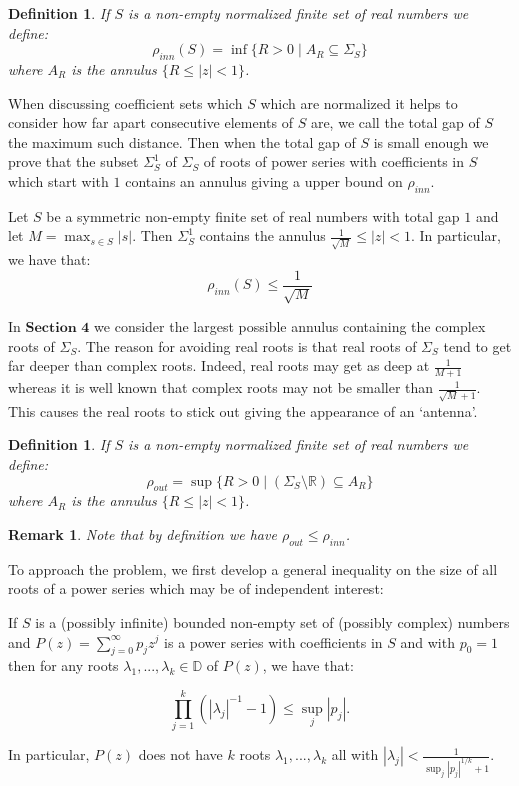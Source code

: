 \documentclass[11pt]{amsart}
\newtheorem{definition}[theorem]{Definition}
\newtheorem*{remark}{Remark}
\numberwithin{theorem}{section} %
\numberwithin{corollary}{section}
\numberwithin{lemma}{section}
\numberwithin{proposition}{section}
\numberwithin{definition}{section}
\newenvironment{customthm}[1]
	{\renewcommand\theinnercustomthm{#1}\innercustomthm}
	{\endinnercustomthm}
\begin{document}
\begin{definition}
If $S$ is a non-empty normalized finite set of real numbers we define:
$$\rho_{inn}(S) = \inf \{R > 0 \mid A_R \subseteq \Sigma_S \} $$
where $A_R$ is the annulus $\{ R \leqslant |z| < 1\}$.
\end{definition}

When discussing coefficient sets which $S$ which are normalized it helps to consider how far apart consecutive elements of $S$ are, we call the total gap of $S$ the maximum such distance. Then when the total gap of $S$ is small enough we prove that the subset $\Sigma_S^1$ of $\Sigma_S$ of roots of power series with coefficients in $S$ which start with $1$ contains an annulus giving a upper bound on $\rho_{inn}$.

\begin{customthm}{\ref{annulus}}
Let $S$ be a symmetric non-empty finite set of real numbers with total gap $1$ and let $M = \max_{s \in S} |s|$. Then $\Sigma^1_S$ contains the annulus $\frac{1}{\sqrt{M}} \leqslant |z| < 1$. In particular, we have that:
$$\rho_{inn}(S) \leqslant \frac{1}{\sqrt{M}} $$
\end{customthm}

In $\textbf{Section 4}$ we consider the largest possible annulus containing the complex roots of $\Sigma_S$. The reason for avoiding real roots is that real roots of $\Sigma_S$ tend to get far deeper than complex roots. Indeed, real roots may get as deep at $\frac{1}{M+1}$ whereas it is well known that complex roots may not be smaller than $\frac{1}{\sqrt{M}+1}$. This causes the real roots to stick out giving the appearance of an `antenna'.

\begin{definition}
If $S$ is a non-empty normalized finite set of real numbers we define:
$$ \rho_{out} = \sup \{ R > 0 \mid (\Sigma_S \setminus \mathbb{R}) \subseteq A_R \} $$
where $A_R$ is the annulus $\{ R \leqslant |z| < 1\}$.
\end{definition}

\begin{remark}
Note that by definition we have $\rho_{out} \leqslant \rho_{inn}$.
\end{remark}

To approach the problem, we first develop a general inequality on the size of all roots of a power series which may be of independent interest:


\begin{customthm}{\ref{prod ineq}}
If $S$ is a (possibly infinite) bounded non-empty set of (possibly complex) numbers and $P(z) = \sum_{j=0}^\infty p_jz^j$ is a power series with coefficients in $S$ and with $p_0 =1$ then for any roots $\lambda_1, ..., \lambda_k \in \mathbb{D}$ of $P(z)$, we have that:

$$\prod_{j=1}^k (|\lambda_j|^{-1} - 1) \leqslant \sup_j |p_j|.$$

In particular, $P(z)$ does not have $k$ roots $\lambda_1, ..., \lambda_k$ all with $|\lambda_j| < \frac{1}{\sup_j|p_j|^{1/k} + 1}$.

\end{customthm}
\end{document}
